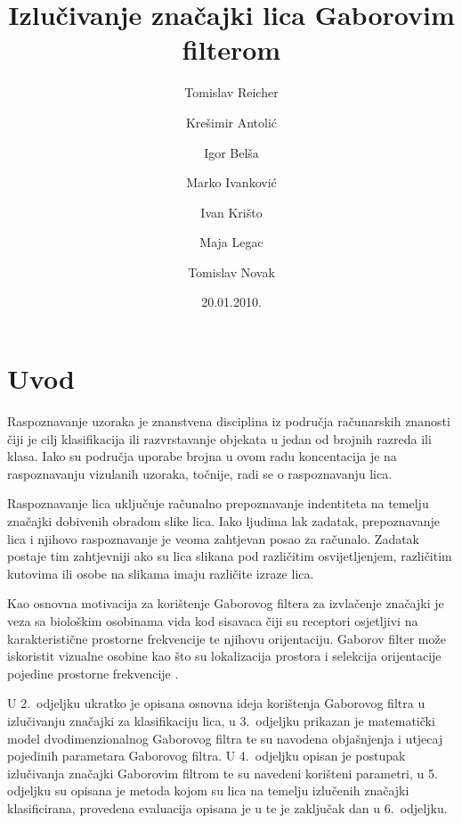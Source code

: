 \documentclass{article}
\begin{document}
\title{Izlučivanje značajki lica Gaborovim filterom}
\author{Tomislav Reicher \and Krešimir Antolić \and Igor Belša \and Marko Ivanković \and Ivan Krišto \and Maja Legac \and Tomislav Novak}
\date{20.01.2010.}
\maketitle

\tableofcontents

\section{Uvod}
Raspoznavanje uzoraka je znanstvena disciplina iz područja računarskih znanosti
čiji je cilj klasifikacija ili razvrstavanje objekata u jedan od brojnih razreda
ili klasa. Iako su područja uporabe brojna u ovom radu koncentacija je na
raspoznavanju vizulanih uzoraka, točnije, radi se o raspoznavanju lica.

Raspoznavanje lica uključuje računalno prepoznavanje indentiteta na temelju
značajki dobivenih obradom slike lica. Iako ljudima lak zadatak, prepoznavanje
lica i njihovo raspoznavanje je veoma zahtjevan posao za računalo. Zadatak
postaje tim zahtjevniji ako su lica slikana pod različitim osvijetljenjem,
različitim kutovima ili osobe na slikama imaju različite izraze lica.

Kao osnovna motivacija za korištenje Gaborovog filtera za izvlačenje značajki je
veza sa biološkim osobinama vida kod sisavaca čiji su receptori osjetljivi na
karakteristične prostorne frekvencije te njihovu orijentaciju. Gaborov filter
može iskoristit vizualne osobine kao što su lokalizacija prostora i selekcija
orijentacije pojedine prostorne frekvencije
\citep{bhuiyan2007onfacerecognition}\nocite{daugman1985uncertainty}.

U 2.~odjeljku ukratko je opisana osnovna ideja korištenja Gaborovog
filtra u izlučivanju značajki za klasifikaciju lica, u 3.~odjeljku prikazan je
matematički model dvodimenzionalnog Gaborovog filtra te su navodena objašnjenja
i utjecaj pojedinih parametara Gaborovog filtra. U 4.~odjeljku opisan je
postupak izlučivanja značajki Gaborovim filtrom te su navedeni korišteni
parametri, u 5. odjeljku su opisana je metoda kojom su lica na temelju
izlučenih značajki klasificirana, provedena evaluacija opisana je u  te je
zaključak dan u 6.~odjeljku.
\end{document}
